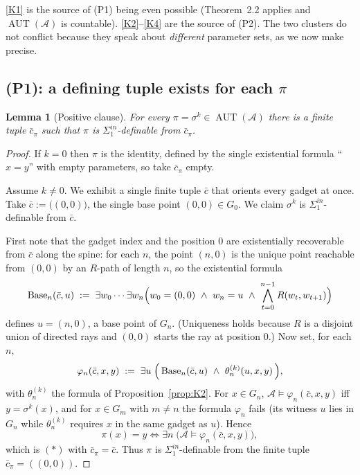 \documentclass[12pt,fullpage]{article}
\newtheorem{lemma}[theorem]{Lemma}
\theoremstyle{definition}
\newcommand{\A}{\mathcal{A}}
\newcommand{\AUT}{\operatorname{AUT}}
\renewcommand{\phi}{\varphi}
\begin{document}
\ref{K1} is the source of (P1) being even possible (Theorem~2.2 applies and
$\AUT(\A)$ is countable). \ref{K2}--\ref{K4} are the source of (P2).  The two
clusters do not conflict because they speak about \emph{different} parameter
sets, as we now make precise.

\subsection*{(P1): a defining tuple exists for each $\pi$}

\begin{lemma}[Positive clause]\label{lem:P1}
For every $\pi=\sigma^k\in\AUT(\A)$ there is a finite tuple $\bar c_\pi$ such
that $\pi$ is $\Sigma^{in}_1$-definable from $\bar c_\pi$.
\end{lemma}

\begin{proof}
If $k=0$ then $\pi$ is the identity, defined by the single existential
formula ``$x=y$'' with empty parameters, so take $\bar c_\pi$ empty.

Assume $k\neq0$.  We exhibit a single finite tuple $\bar c$ that orients every
gadget at once.  Take $\bar c:=\bigl((0,0)\bigr)$, the single base point
$(0,0)\in G_0$.  We claim $\sigma^k$ is $\Sigma^{in}_1$-definable from
$\bar c$.

First note that the gadget index and the position $0$ are existentially
recoverable from $\bar c$ along the spine: for each $n$, the point $(n,0)$ is
the unique point reachable from $(0,0)$ by an $R$-path of length $n$, so the
existential formula
\[
\mathrm{Base}_n(\bar c,u)\;:=\;\exists w_0\cdots\exists w_n\Bigl(w_0=(0,0)\ \wedge\ w_n=u\ \wedge\ \bigwedge_{t=0}^{n-1}R(w_t,w_{t+1})\Bigr)
\]
defines $u=(n,0)$, a base point of $G_n$.  (Uniqueness holds because $R$ is a
disjoint union of directed rays and $(0,0)$ starts the ray at position $0$.)
Now set, for each $n$,
\[
\phi_n(\bar c,x,y)\;:=\;
\exists u\;\Bigl(\,\mathrm{Base}_n(\bar c,u)\ \wedge\ \theta_n^{(k)}(u,x,y)\,\Bigr),
\]
with $\theta_n^{(k)}$ the formula of Proposition~\ref{prop:K2}.  For
$x\in G_n$, $\A\models\phi_n(\bar c,x,y)$ iff $y=\sigma^k(x)$, and for
$x\in G_m$ with $m\ne n$ the formula $\phi_n$ fails (its witness $u$ lies in
$G_n$ while $\theta_n^{(k)}$ requires $x$ in the same gadget as $u$).  Hence
\[
\pi(x)=y\iff\exists n\;\bigl(\A\models\phi_n(\bar c,x,y)\bigr),
\]
which is $(\ast)$ with $\bar c_\pi=\bar c$.  Thus $\pi$ is
$\Sigma^{in}_1$-definable from the finite tuple $\bar c_\pi=((0,0))$.
\end{proof}
\end{document}

